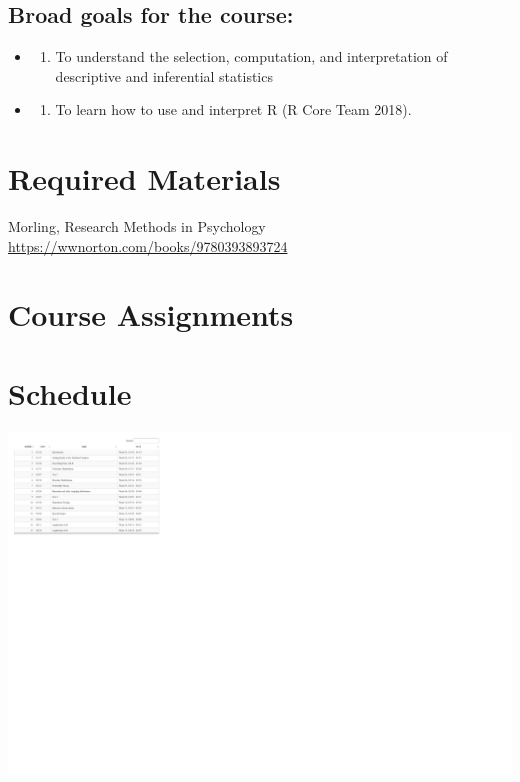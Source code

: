 \hypertarget{broad-goals-for-the-course-1}{%
\subsection*{Broad goals for the course:}\label{broad-goals-for-the-course-1}}


\begin{itemize}
\item
  \begin{enumerate}
  \def\labelenumi{\arabic{enumi}.}
  \tightlist
  \item
    To understand the selection, computation, and interpretation of descriptive and inferential
    statistics
  \end{enumerate}
\item
  \begin{enumerate}
  \def\labelenumi{\arabic{enumi}.}
  \setcounter{enumi}{1}
  \tightlist
  \item
    To learn how to use and interpret R (R Core Team 2018).
  \end{enumerate}
\end{itemize}

\hypertarget{required-materials-1}{%
\section*{Required Materials}\label{required-materials-1}}


Morling, Research Methods in Psychology \url{https://wwnorton.com/books/9780393893724}

\hypertarget{course-assignments-1}{%
\section*{Course Assignments}\label{course-assignments-1}}


\hypertarget{schedule-1}{%
\section*{Schedule}\label{schedule-1}}


\includegraphics{0202_stats_files/figure-latex/unnamed-chunk-1-1.pdf}

